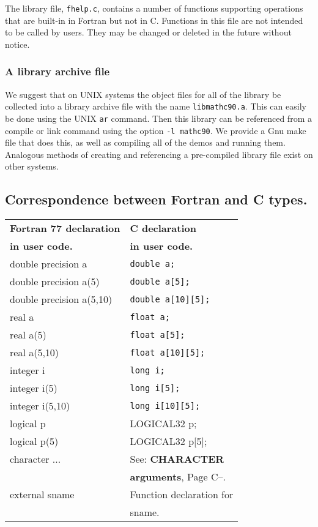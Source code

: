 \documentclass[twoside]{MATH77}
\begin{document}
The library file, {\tt fhelp.c}, contains a number of functions supporting
operations that are built-in in Fortran but not in C. Functions in this
file are not intended to be called by users. They may be changed or deleted
in the future without notice.

\subsubsection{A library archive file\label{libarc}}

We suggest that on UNIX systems the object files for all of the library be
collected into a library archive file with the name {\tt libmathc90.a}. This
can easily be done using the UNIX {\tt ar} command. Then this library can be
referenced from a compile or link command using the option {\tt -l mathc90}.
We provide a Gnu make file that does this, as well as compiling all of the
demos and running them.  Analogous methods of creating and referencing a
pre-compiled library file exist on other systems.

\subsection{Correspondence between Fortran and C types.\label{corr}}

\begin{tabular}{ll}
{\bf Fortran 77 declaration} & {\bf C declaration}\\
{\bf in user code.} & {\bf in user code.}\\
double precision a  & {\tt double a;}\\
double precision a(5) & {\tt double a[5];}\\
double precision a(5,10) & {\tt double a[10][5];}\\
real a & {\tt float a;}\\
real a(5) & {\tt float a[5];}\\
real a(5,10) & {\tt float a[10][5];}\\
integer i & {\tt long i;}\\
integer i(5) & {\tt long i[5];}\\
integer i(5,10) & {\tt long i[10][5];}\\
logical p & LOGICAL32 p;\\
logical p(5) & LOGICAL32 p[5];\\
character ... & See: {\bf CHARACTER}\\
 & {\bf arguments}, Page C--\pageref{chararg}.\\
external sname & Function declaration for\\
 & sname.\\
\end{tabular}
\end{document}
